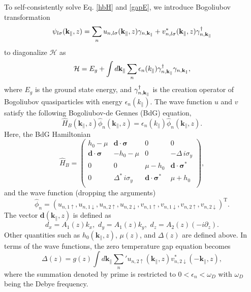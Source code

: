 To self-consistently solve Eq. \eqref{hbH} and \eqref{gapE}, we introduce
Bogoliubov transformation
\begin{equation}
 \psi_{l \sigma}(\mathbf{k}_\parallel,z) = \sum_n  u_{n,l \sigma} (\mathbf{k}_\parallel, z) \gamma_{n,\mathbf{k}_\parallel} + v^\ast_{n,l \sigma} (\mathbf{k}_\parallel, z) \gamma_{n,\mathbf{k}_\parallel}^\dagger
\end{equation}
to diagonalize $\mathcal{H}$ as
\begin{equation}
\mathcal{H} = E_g + \int d \mathbf{k}_\parallel\sum_n \epsilon_n(k_\parallel) \gamma_{n,\mathbf{k}_\parallel}^\dagger \gamma_{n,\mathbf{k}_\parallel} ,
\end{equation}
where $E_g$ is the ground state energy, and $\gamma_{n,\mathbf{k}_\parallel}^\dagger$
is the creation operator of Bogoliubov quasiparticles with energy $\epsilon_n(k_\parallel)$.
The wave function $u$ and $v$ satisfy the following Bogoliubov-de Gennes (BdG) equation,
\begin{equation}
\hat{H}_{B}(\mathbf{k}_\parallel,z) \hat{\phi}_n(\mathbf{k}_\parallel,z)=\epsilon_n(k_\parallel)\hat{\phi}_n (\mathbf{k}_\parallel,z).
\label{bdgsimp}
\end{equation}
Here, the BdG Hamiltonian
\begin{equation}
\hat{H}_{B}=\left( \begin{array}{cccc}
h_0 -\mu  & \mathbf{d} \cdot \boldsymbol{\sigma}&0&0\\ 
 \mathbf{d} \cdot \boldsymbol{\sigma} &-h_0 -\mu &0&-\Delta\, i\sigma_y\\ 
0 &0& \mu -h_0 & \mathbf{d} \cdot \boldsymbol{\sigma}^* \\
0 &\Delta^{\ast} \, i\sigma_y & \mathbf{d} \cdot \boldsymbol{\sigma}^* & \mu+h_0\\ 
 \end{array} \right), \label{bdgH} 
\end{equation}
and the wave function (dropping the arguments)
\begin{equation}
\hat{\phi}_n=(u_{n,1\uparrow}, u_{n,1\downarrow}, u_{n,2\uparrow}, u_{n,2\downarrow}, 
v_{n,1\uparrow}, v_{n,1\downarrow}, v_{n,2\uparrow}, v_{n,2\downarrow})^\mathrm{T}.
\end{equation}
The vector $\mathbf{d}(\mathbf{k}_\parallel,z)$ is defined as
\begin{equation}
d_x=A_1(z)k_x,\,\, d_y=A_1(z)k_y,\,\, d_z=A_2(z)(-i\partial_z).
\end{equation} 
Other quantities such as $h_0(\mathbf{k}_\parallel,z)$, $\mu(z)$, and $\Delta(z)$ are 
defined above.
In terms of the wave functions, the zero temperature gap equation becomes
\begin{equation}
\Delta(z) = g(z) \int d \mathbf{k}_\parallel \sum_n' u_{n,2 \uparrow}(\mathbf{k}_\parallel,z) v^*_{n,2\downarrow}(-\mathbf{k}_\parallel,z) ,
\end{equation}
where the summation denoted by prime is restricted to $0<\epsilon_n<\omega_D$ with 
$\omega_D$ being the Debye frequency.


